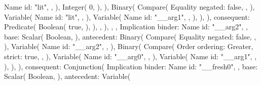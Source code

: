 \documentclass[
  oneside,
  english,
  coorientadorbanca,
  noabntexcite
]{ufsc-thesis-rn46-2019}
\begin{document}
\begin{rustcode}
{{{{                                    Name {
                                        id: "lit",
                                    },
                                ),
                                Integer(
                                    0,
                                ),
                            ),
                            Binary(
                                Compare(
                                    Equality {
                                        negated: false,
                                    },
                                ),
                                Variable(
                                    Name {
                                        id: "lit",
                                    },
                                ),
                                Variable(
                                    Name {
                                        id: "__arg1",
                                    },
                                ),
                            ),
                        ),
                        consequent: Predicate(
                            Boolean(
                                true,
                            ),
                        ),
                    },
                ),
            },
        },
        Implication {
            binder: Name {
                id: "__arg2",
            },
            base: Scalar(
                Boolean,
            ),
            antecedent: Binary(
                Compare(
                    Equality {
                        negated: false,
                    },
                ),
                Variable(
                    Name {
                        id: "__arg2",
                    },
                ),
                Binary(
                    Compare(
                        Order {
                            ordering: Greater,
                            strict: true,
                        },
                    ),
                    Variable(
                        Name {
                            id: "__arg0",
                        },
                    ),
                    Variable(
                        Name {
                            id: "__arg1",
                        },
                    ),
                ),
            ),
            consequent: Conjunction(
                Implication {
                    binder: Name {
                        id: "__fresh0",
                    },
                    base: Scalar(
                        Boolean,
                    ),
                    antecedent: Variable(
}}}
\end{rustcode}
\end{document}
